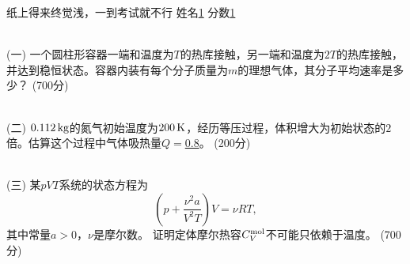\documentclass[12pt,CJK]{article}
\def\mark#1{{\color{blue} (#1分)}}
\begin{document}
\bch


{\blue 纸上得来终觉浅，一到考试就不行} {} 姓名\uline{1} {\hskip 0.5in} 分数\uline{1}

{\vskip 0.3in}
\ \\
(一) 一个圆柱形容器一端和温度为$T$的热库接触，另一端和温度为$2T$的热库接触，并达到稳恒状态。容器内装有每个分子质量为$m$的理想气体，其分子平均速率是多少？ \mark{700}

{\vskip 2.5in}
\ \\
(二) $0.112\,\mathrm{kg}$的氮气初始温度为$200\,\mathrm{K}$，经历等压过程，体积增大为初始状态的$2$倍。估算这个过程中气体吸热量$Q=$\uline{0.8}。 \mark{200}

{\vskip 0.1in}
\ \\
(三) 某$pVT$系统的状态方程为
$$\left(p+\frac{\nu^2 a}{V^2T}\right)V = \nu R T,$$
其中常量$a>0$，$\nu$是摩尔数。 证明定体摩尔热容$C_V^{\rm mol}$不可能只依赖于温度。 \mark{700}



\ech
\end{document}
